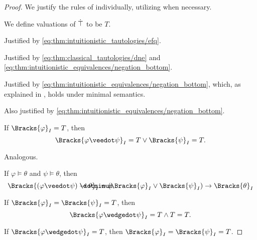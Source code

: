 \begin{proof}
  We justify the rules of  individually, utilizing  when necessary.

   We define valuations of \( \dot{\top} \) to be \( T \).

   Justified by \eqref{eq:thm:intuitionistic_tautologies/efq}.

   Justified by \eqref{eq:thm:classical_tautologies/dne} and \eqref{eq:thm:intuitionistic_equivalences/negation_bottom}.

   Justified by \eqref{eq:thm:intuitionistic_equivalences/negation_bottom}, which, as explained in , holds under minimal semantics.

   Also justified by \eqref{eq:thm:intuitionistic_equivalences/negation_bottom}.

   If \( \Bracks{\varphi}_I = T \), then
  \begin{equation*}
    \Bracks{\varphi \synvee \psi}_I = T \vee \Bracks{\psi}_I = T.
  \end{equation*}

   Analogous.

   If \( \varphi \vDash \theta \) and \( \psi \vDash \theta \), then
  \begin{equation*}
    \Bracks{(\varphi \synvee \psi) \synimplies \theta}_I
    =
    (\Bracks{\varphi}_I \vee \Bracks{\psi}_I) \rightarrow \Bracks{\theta}_I
  \end{equation*}

   If \( \Bracks{\varphi}_I = \Bracks{\psi}_I = T \), then
  \begin{equation*}
    \Bracks{\varphi \synwedge \psi}_I = T \wedge T = T.
  \end{equation*}

   If \( \Bracks{\varphi \synwedge \psi}_I = T \), then \( \Bracks{\varphi}_I = \Bracks{\psi}_I = T \).


\end{proof}
